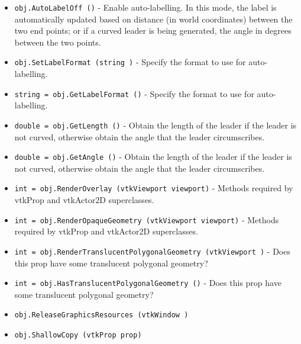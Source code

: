 \begin{itemize}
\item  \verb|obj.AutoLabelOff ()| -  Enable auto-labelling. In this mode, the label is automatically updated
 based on distance (in world coordinates) between the two end points; or
 if a curved leader is being generated, the angle in degrees between the
 two points.

\item  \verb|obj.SetLabelFormat (string )| -  Specify the format to use for auto-labelling.

\item  \verb|string = obj.GetLabelFormat ()| -  Specify the format to use for auto-labelling.

\item  \verb|double = obj.GetLength ()| -  Obtain the length of the leader if the leader is not curved,
 otherwise obtain the angle that the leader circumscribes.

\item  \verb|double = obj.GetAngle ()| -  Obtain the length of the leader if the leader is not curved,
 otherwise obtain the angle that the leader circumscribes.

\item  \verb|int = obj.RenderOverlay (vtkViewport viewport)| -  Methods required by vtkProp and vtkActor2D superclasses.

\item  \verb|int = obj.RenderOpaqueGeometry (vtkViewport viewport)| -  Methods required by vtkProp and vtkActor2D superclasses.

\item  \verb|int = obj.RenderTranslucentPolygonalGeometry (vtkViewport )| -  Does this prop have some translucent polygonal geometry?

\item  \verb|int = obj.HasTranslucentPolygonalGeometry ()| -  Does this prop have some translucent polygonal geometry?

\item  \verb|obj.ReleaseGraphicsResources (vtkWindow )|

\item  \verb|obj.ShallowCopy (vtkProp prop)|

\end{itemize}
